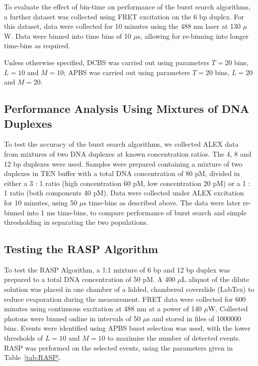 To evaluate the effect of bin-time on performance of the burst search algorithms, a further dataset was collected using FRET excitation on the 6 bp duplex. For this dataset, data were collected for 10 minutes using the 488 nm laser at 130 $\mu$W. Data were binned into time bins of 10 $\mu$s, allowing for re-binning into longer time-bins as required.

Unless otherwise specified, DCBS was carried out using parameters $T = 20$ bins, $L = 10$ and $M = 10$; APBS was carried out using parameters $T = 20$ bins, $L = 20$ and $M = 20$.

\subsection{Performance Analysis Using Mixtures of DNA Duplexes}
To test the accuracy of the burst search algorithms, we collected ALEX data from mixtures of two DNA duplexes at known concentration ratios. The 4, 8 and 12 bp duplexes were used. Samples were prepared containing a mixture of two duplexes in TEN buffer with a total DNA concentration of 80 pM, divided in either a 3 : 1 ratio (high concentration 60 pM, low concentration 20 pM) or a 1 : 1 ratio (both components 40 pM). Data were collected under ALEX excitation for 10 minutes, using 50 $\mu$s time-bins as described above. The data were later re-binned into 1 ms time-bins, to compare performance of burst search and simple thresholding in separating the two populations.  


\subsection{Testing the RASP Algorithm}
To test the RASP Algorithm, a 1:1 mixture of 6 bp and 12 bp duplex was prepared to a total DNA concentration of 50 pM. A 400 $\mu$L aliquot of the dilute solution was placed in one chamber of a lidded, chambered coverslide (LabTex) to reduce evaporation during the measurement. FRET data were collected for 600 minutes using continuous excitation at 488 nm at a power of 140 $\mu$W. Collected photons were binned online in intervals of 50 $\mu$s and stored in files of 1000000 bins. Events were identified using APBS burst selection was used, with the lower thresholds of $L = 10$ and $M = 10$ to maximise the number of detected events. RASP was performed on the selected events, using the parameters given in Table~\ref{tab:RASP}. 

